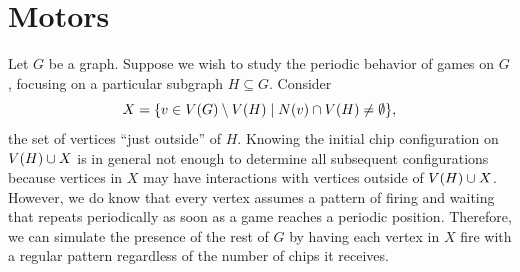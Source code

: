 \section{Motors}\label{motors}

Let $G$ be a graph. Suppose we wish to study the periodic behavior of games on
$G$, focusing on a particular subgraph $H \subseteq G$. Consider
\begin{equation*}
  X = \set{v \in \V \setminus \V[H]}{\N{v} \cap \V[H] \neq \emptyset},
\end{equation*}
the set of vertices ``just outside'' of $H$. Knowing the initial chip
configuration on $\V[H] \cup X$ is in general not enough to determine all
subsequent configurations because vertices in $X$ may have interactions with
vertices outside of $\V[H] \cup X$. However, we do know that every vertex
assumes a pattern of firing and waiting that repeats periodically as soon as a
game reaches a periodic position. Therefore, we can simulate the presence of
the rest of $G$ by having each vertex in $X$ fire with a regular pattern
regardless of the number of chips it receives.

